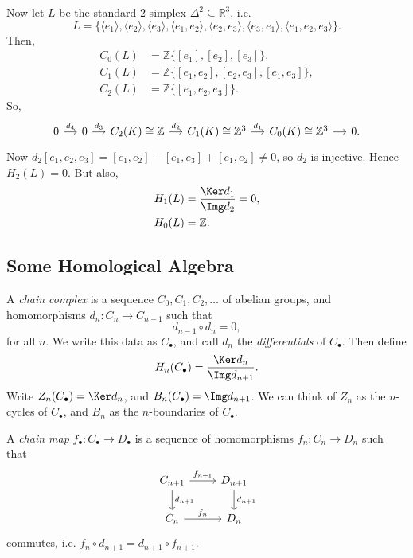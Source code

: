 \documentclass[12pt]{article}
\begin{document}
\begin{exbox}
	Now let $L$ be the standard $2$-simplex $\Delta^2 \subseteq \mathbb{R}^3$, i.e.
	\[
		L = \{\langle e_1 \rangle , \langle e_2 \rangle , \langle e_3 \rangle, \langle e_1, e_2 \rangle, \langle e_2, e_3\rangle, \langle e_3, e_1\rangle, \langle e_1, e_2, e_3 \rangle\}.
	\]
	Then,
	\begin{align*}
		C_0(L) &= \mathbb{Z}\{[e_1], [e_2], [e_3]\}, \\
		C_1(L) &= \mathbb{Z}\{[e_1, e_2], [e_2, e_3], [e_1, e_3]\}, \\
		C_2(L) &= \mathbb{Z}\{[e_1, e_2, e_3]\}.
	\end{align*}
	So,
	\[
	\begin{tikzcd}[column sep = small]
		0 \arrow[r, "d_4"] & 0 \arrow[r, "d_3"] & C_2(K) \cong \mathbb{Z} \arrow[r, "d_2"] & C_1(K) \cong \mathbb{Z}^3 \arrow[r, "d_1"] & C_0(K) \cong \mathbb{Z}^3 \arrow[r] & 0.
	\end{tikzcd}
	\]
	Now $d_2[e_1, e_2, e_3] = [e_1, e_2] - [e_1, e_3] + [e_1, e_2] \neq 0$, so $d_2$ is injective. Hence $H_2(L) = 0$. But also,
	\begin{align*}
		H_1(L) &= \frac{\Ker d_1}{\Img d_2} = 0, \\
		H_0(L) &= \mathbb{Z}.
	\end{align*}
\end{exbox}

\subsection{Some Homological Algebra}
\label{sub:hom_alg}

\begin{definition}
	A \emph{chain complex} is a sequence $C_0, C_1, C_2, \ldots$ of abelian groups, and homomorphisms $d_n : C_n \to C_{n-1}$ such that
	\[
	d_{n-1} \circ d_n = 0,
	\]
	for all $n$. We write this data as $C_\bullet$, and call $d_n$ the \emph{differentials} of $C_\bullet$. Then define
	\[
	H_n(C_\bullet) = \frac{\Ker d_n}{\Img d_{n+1}}.
	\]
	Write $Z_n(C_\bullet) = \Ker d_n$, and $B_n(C_\bullet) = \Img d_{n+1}$. We can think of $Z_n$ as the $n$-cycles of $C_\bullet$, and $B_n$ as the $n$-boundaries of $C_\bullet$.

	A \emph{chain map} $f_\bullet : C_\bullet \to D_\bullet$ is a sequence of homomorphisms $f_n : C_n \to D_n$ such that
	\[
	\begin{tikzcd}
		C_{n+1} \arrow[r, "f_{n+1}"] \arrow[d, "d_{n+1}"] & D_{n+1} \arrow[d, "d_{n+1}"] \\
		C_n \arrow[r, "f_n"] & D_n
	\end{tikzcd}
	\]
	commutes, i.e. $f_n \circ d_{n+1} = d_{n+1} \circ f_{n+1}$.
\end{definition}
\end{document}
